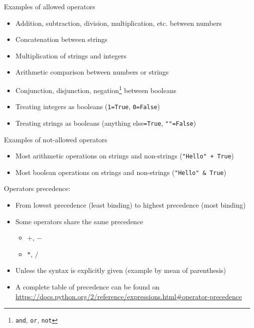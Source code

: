 \documentclass{beamer}
\begin{document}
\begin{slide}{
\item Examples of allowed operators
\begin{itemize}
\item Addition, subtraction, division, multiplication, etc. between numbers
\item Concatenation between strings
\item Multiplication of strings and integers
\item Arithmetic comparison between numbers or strings
\item Conjunction, disjunction, negation\footnote{\texttt{and}, \texttt{or}, \texttt{not}} between booleans
\item Treating integers as booleans (\texttt{1=True}, \texttt{0=False})
\item Treating strings as booleans (anything else\texttt{=True}, \texttt{""=False})
\end{itemize}
}\end{slide}

\begin{slide}{
\item Examples of not-allowed operators
\begin{itemize}
\item Most arithmetic operations on strings and non-strings (\texttt{"Hello" + True})
\item Most boolean operations on strings and non-strings (\texttt{"Hello" \& True})
\end{itemize}
}\end{slide}

\begin{slide}{
\item Operators precedence:
\begin{itemize}
\item From lowest precedence (least binding) to highest precedence (most binding) 
\pause
\item Some operators share the same precedence 
\begin{itemize}
\item $+$, $-$
\item $*$, $/$
\end{itemize}
\pause
\item Unless the syntax is explicitly given (example by mean of parenthesis)
\pause
\item A complete table of precedence can be found on \url{https://docs.python.org/2/reference/expressions.html\#operator-precedence}
\end{itemize}
}\end{slide}
\end{document}
